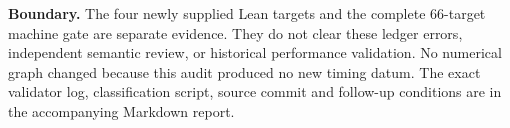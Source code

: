 \documentclass[10pt]{article}
\begin{document}
\textbf{Boundary.} The four newly supplied Lean targets and the complete
66-target machine gate are separate evidence. They do not clear these ledger
errors, independent semantic review, or historical performance validation.
No numerical graph changed because this audit produced no new timing datum.
The exact validator log, classification script, source commit and follow-up
conditions are in the accompanying Markdown report.
\end{document}
